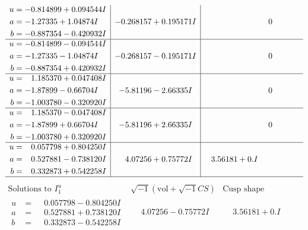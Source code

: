 \documentclass[1p]{elsarticle_modified}
\theoremstyle{definition}
\newcommand{\I}{\sqrt{-1}}
\begin{document}
$$\begin{array}{c|c|c}
\begin{aligned}
u &= -0.814899 + 0.094544 I \\
a &= -1.27335 + 1.04874 I \\
b &= -0.887354 - 0.420932 I\end{aligned}
 & -0.268157 + 0.195171 I & \phantom{-0.000000 } 0 \\ \hline\begin{aligned}
u &= -0.814899 - 0.094544 I \\
a &= -1.27335 - 1.04874 I \\
b &= -0.887354 + 0.420932 I\end{aligned}
 & -0.268157 - 0.195171 I & \phantom{-0.000000 } 0 \\ \hline\begin{aligned}
u &= \phantom{-}1.185370 + 0.047408 I \\
a &= -1.87899 - 0.66704 I \\
b &= -1.003780 - 0.320920 I\end{aligned}
 & -5.81196 - 2.66335 I & \phantom{-0.000000 } 0 \\ \hline\begin{aligned}
u &= \phantom{-}1.185370 - 0.047408 I \\
a &= -1.87899 + 0.66704 I \\
b &= -1.003780 + 0.320920 I\end{aligned}
 & -5.81196 + 2.66335 I & \phantom{-0.000000 } 0 \\ \hline\begin{aligned}
u &= \phantom{-}0.057798 + 0.804250 I \\
a &= \phantom{-}0.527881 - 0.738120 I \\
b &= \phantom{-}0.332873 + 0.542258 I\end{aligned}
 & \phantom{-}4.07256 + 0.75772 I & \phantom{-}3.56181 + 0. I\phantom{ +0.000000I}\\
 \hline 
 \end{array}$$\newpage$$\begin{array}{c|c|c}  
\text{Solutions to }I^u_{1}& \I (\text{vol} + \sqrt{-1}CS) & \text{Cusp shape}\\
 \hline 
\begin{aligned}
u &= \phantom{-}0.057798 - 0.804250 I \\
a &= \phantom{-}0.527881 + 0.738120 I \\
b &= \phantom{-}0.332873 - 0.542258 I\end{aligned}
 & \phantom{-}4.07256 - 0.75772 I & \phantom{-}3.56181 + 0. I\phantom{ +0.000000I} \\ \hline\begin{aligned}

\end{aligned}
\end{array}$$
\end{document}
